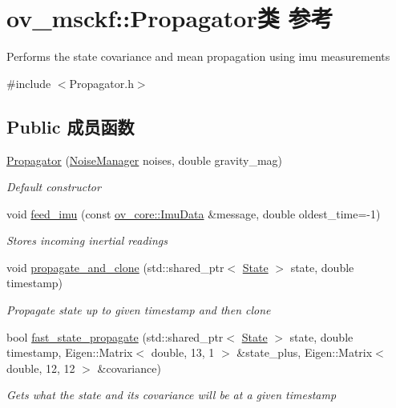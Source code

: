 \hypertarget{classov__msckf_1_1Propagator}{}\section{ov\+\_\+msckf\+:\+:Propagator类 参考}
\label{classov__msckf_1_1Propagator}


Performs the state covariance and mean propagation using imu measurements  




{\ttfamily \#include $<$Propagator.\+h$>$}

\subsection*{Public 成员函数}
\begin{DoxyCompactItemize}
\item 
\hyperlink{classov__msckf_1_1Propagator_a041751e94b04af4134c31a5f32c58d47}{Propagator} (\hyperlink{structov__msckf_1_1NoiseManager}{Noise\+Manager} noises, double gravity\+\_\+mag)
\begin{DoxyCompactList}\small\item\em Default constructor \end{DoxyCompactList}\item 
void \hyperlink{classov__msckf_1_1Propagator_aa9badf8180a77869e6027d359af8121e}{feed\+\_\+imu} (const \hyperlink{structov__core_1_1ImuData}{ov\+\_\+core\+::\+Imu\+Data} \&message, double oldest\+\_\+time=-\/1)
\begin{DoxyCompactList}\small\item\em Stores incoming inertial readings \end{DoxyCompactList}\item 
void \hyperlink{classov__msckf_1_1Propagator_ac96e7c40b696501a1f68097e10dde319}{propagate\+\_\+and\+\_\+clone} (std\+::shared\+\_\+ptr$<$ \hyperlink{classov__msckf_1_1State}{State} $>$ state, double timestamp)
\begin{DoxyCompactList}\small\item\em Propagate state up to given timestamp and then clone \end{DoxyCompactList}\item 
bool \hyperlink{classov__msckf_1_1Propagator_a33aabf2aea886a848a5ea3f6d83be4a4}{fast\+\_\+state\+\_\+propagate} (std\+::shared\+\_\+ptr$<$ \hyperlink{classov__msckf_1_1State}{State} $>$ state, double timestamp, Eigen\+::\+Matrix$<$ double, 13, 1 $>$ \&state\+\_\+plus, Eigen\+::\+Matrix$<$ double, 12, 12 $>$ \&covariance)
\begin{DoxyCompactList}\small\item\em Gets what the state and its covariance will be at a given timestamp \end{DoxyCompactList}\end{DoxyCompactItemize}

